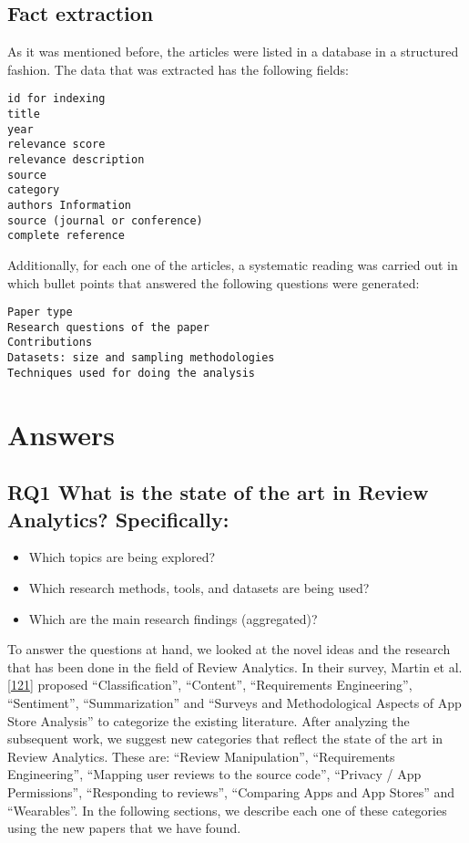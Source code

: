 \documentclass[]{book}
\providecommand{\tightlist}{%
  \setlength{\itemsep}{0pt}\setlength{\parskip}{0pt}}
\begin{document}
\subsection{Fact extraction}\label{fact-extraction}

As it was mentioned before, the articles were listed in a database in a
structured fashion. The data that was extracted has the following
fields:

\begin{verbatim}
id for indexing
title
year 
relevance score 
relevance description 
source 
category
authors Information
source (journal or conference)
complete reference
\end{verbatim}

Additionally, for each one of the articles, a systematic reading was
carried out in which bullet points that answered the following questions
were generated:

\begin{verbatim}
Paper type
Research questions of the paper
Contributions
Datasets: size and sampling methodologies
Techniques used for doing the analysis 
\end{verbatim}

\section{Answers}\label{answers-5}

\subsection{\texorpdfstring{\textbf{RQ1} What is the state of the art in
Review Analytics?
Specifically:}{RQ1 What is the state of the art in Review Analytics? Specifically:}}\label{rq1-what-is-the-state-of-the-art-in-review-analytics-specifically}

\begin{itemize}
\tightlist
\item
  Which topics are being explored?
\item
  Which research methods, tools, and datasets are being used?
\item
  Which are the main research findings (aggregated)?
\end{itemize}

To answer the questions at hand, we looked at the novel ideas and the
research that has been done in the field of Review Analytics. In their
survey, Martin et al.
{[}\protect\hyperlink{ref-martin2015survey}{121}{]} proposed
``Classification'', ``Content'', ``Requirements Engineering'',
``Sentiment'', ``Summarization'' and ``Surveys and Methodological
Aspects of App Store Analysis'' to categorize the existing literature.
After analyzing the subsequent work, we suggest new categories that
reflect the state of the art in Review Analytics. These are: ``Review
Manipulation'', ``Requirements Engineering'', ``Mapping user reviews to
the source code'', ``Privacy / App Permissions'', ``Responding to
reviews'', ``Comparing Apps and App Stores'' and ``Wearables''. In the
following sections, we describe each one of these categories using the
new papers that we have found.
\end{document}
